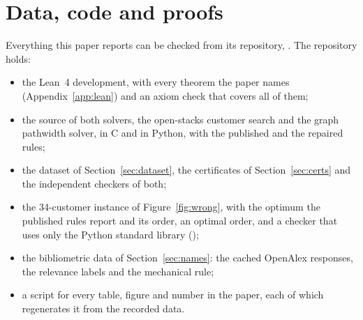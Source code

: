 \section*{Data, code and proofs}
\label{sec:data}

Everything this paper reports can be checked from its repository,
. The repository holds:
\begin{itemize}
\item the Lean~4 development, with every theorem the paper names
  (Appendix~\ref{app:lean}) and an axiom check that covers all of them;
\item the source of both solvers, the open-stacks customer search and the graph
  pathwidth solver, in C and in Python, with the published and the repaired
  rules;
\item the dataset of Section~\ref{sec:dataset}, the certificates of
  Section~\ref{sec:certs} and the independent checkers of both;
\item the 34-customer instance of Figure~\ref{fig:wrong}, with the optimum
  the published rules report and its order, an optimal order, and a checker
  that uses only the Python standard library
  ();
\item the bibliometric data of Section~\ref{sec:names}: the cached OpenAlex
  responses, the relevance labels and the mechanical rule;
\item a script for every table, figure and number in the paper, each of which
  regenerates it from the recorded data.
\end{itemize}
